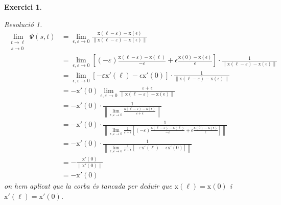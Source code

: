 \documentclass[10pt,a4paper]{article}
\newcommand{\vf}[1]{\boldsymbol{\mathrm{#1}}} %
\newtheorem{exercice}{Exercici}
\theoremstyle{remark}
\newtheorem*{resolution}{Resolució}
\theoremstyle{math}
\begin{document}
\begin{exercice}
\begin{enumerate}
\begin{resolution}
            \begin{align*}
              \lim_{\substack{t\to \ell                                                                                                                                                                                                                                         \\s\to 0}}\Psi(s,t) & =\lim_{\epsilon,\varepsilon\to 0}\frac{\vf{x}(\ell-\varepsilon)-\vf{x}(\epsilon)}{\|\vf{x}(\ell-\varepsilon)-\vf{x}(\epsilon)\|}                                                                                 \\
               & =\lim_{\epsilon,\varepsilon\to 0}\left[(-\varepsilon)\frac{\vf{x}(\ell-\varepsilon)-\vf{x}(\ell)}{-\varepsilon}+\epsilon\frac{\vf{x}(0)-\vf{x}(\epsilon)}{\epsilon}\right]\cdot\frac{1}{\|\vf{x}(\ell-\varepsilon)-\vf{x}(\epsilon)\|}                         \\
               & =\lim_{\epsilon,\varepsilon\to 0}\left[-\varepsilon\vf{x}'(\ell)-\epsilon\vf{x}'(0)\right]\cdot\frac{1}{\|\vf{x}(\ell-\varepsilon)-\vf{x}(\epsilon)\|}                                                                                                         \\
               & =-\vf{x}'(0)\lim_{\epsilon,\varepsilon\to 0}\frac{\varepsilon+\epsilon}{\|\vf{x}(\ell-\varepsilon)-\vf{x}(\epsilon)\|}                                                                                                                                         \\
               & =-\vf{x}'(0)\cdot\frac{1}{\left\|\displaystyle\lim_{\epsilon,\varepsilon\to 0}\frac{\vf{x}(\ell-\varepsilon)-\vf{x}(\epsilon)}{\varepsilon+\epsilon}\right\|}                                                                                                  \\
               & =-\vf{x}'(0)\cdot\frac{1}{\left\|\displaystyle\lim_{\epsilon,\varepsilon\to 0}\frac{1}{\varepsilon+\epsilon}\left[(-\varepsilon)\frac{\vf{x}(\ell-\varepsilon)-\vf{x}(\ell)}{-\varepsilon}+\epsilon\frac{\vf{x}(0)-\vf{x}(\epsilon)}{\epsilon}\right]\right\|} \\
               & =-\vf{x}'(0)\cdot\frac{1}{\left\|\displaystyle\lim_{\epsilon,\varepsilon\to 0}\frac{1}{\varepsilon+\epsilon}\left[-\varepsilon\vf{x}'(\ell)-\epsilon\vf{x}'(0)\right]\right\|}                                                                                 \\
               & = -\frac{\vf{x}'(0)}{\|\vf{x}'(0)\|}                                                                                                                                                                                                                           \\
               & = -\vf{x}'(0)
            \end{align*}
            on hem aplicat que la corba és tancada per deduir que $\vf{x}(\ell)=\vf{x}(0)$ i $\vf{x}'(\ell)=\vf{x}'(0)$.


\end{resolution}
\end{enumerate}
\end{exercice}
\end{document}
